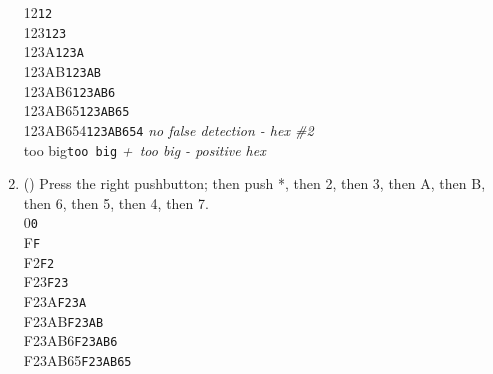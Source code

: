 \begin{enumerate}
    {\dviiseg \phantom{000000}12}\hspace{1cm}\texttt{12} \\
    {\dviiseg \phantom{00000}123}\hspace{1cm}\texttt{123} \\
    {\dviiseg \phantom{0000}123A}\hspace{1cm}\texttt{123A} \\
    {\dviiseg \phantom{000}123AB}\hspace{1cm}\texttt{123AB} \\
    {\dviiseg \phantom{00}123AB6}\hspace{1cm}\texttt{123AB6} \\
    {\dviiseg \phantom{0}123AB65}\hspace{1cm}\texttt{123AB65} \\
    {\dviiseg           123AB654}\hspace{1cm}\texttt{123AB654}\hspace{1cm}
    \textit{no false detection - hex \#2} \\
    {\dviiseg \phantom{0}too big}\hspace{1cm}\texttt{too big}\hspace{1cm}
    \textit{+\textonequarter\ too big - positive hex}
\item (\phantom{xxx}) Press the right pushbutton; then push *, then 2, then 3, then A, then B, then 6, then 5, then 4, then 7. \\
    {\dviiseg \phantom{0000000}0}\hspace{1cm}\texttt{0} \\
    {\dviiseg \phantom{0000000}F}\hspace{1cm}\texttt{F} \\
    {\dviiseg \phantom{000000}F2}\hspace{1cm}\texttt{F2} \\
    {\dviiseg \phantom{00000}F23}\hspace{1cm}\texttt{F23} \\
    {\dviiseg \phantom{0000}F23A}\hspace{1cm}\texttt{F23A} \\
    {\dviiseg \phantom{000}F23AB}\hspace{1cm}\texttt{F23AB} \\
    {\dviiseg \phantom{00}F23AB6}\hspace{1cm}\texttt{F23AB6} \\
    {\dviiseg \phantom{0}F23AB65}\hspace{1cm}\texttt{F23AB65} \\

\end{enumerate}
